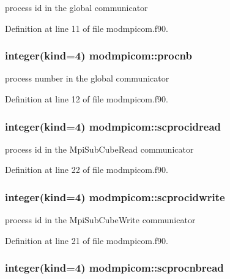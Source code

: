 process id in the global communicator 



Definition at line 11 of file modmpicom.\-f90.

\hypertarget{classmodmpicom_a5e40853b0f15e4c14658ea56fb1b9b73}{
\subsubsection[{procnb}]{\setlength{\rightskip}{0pt plus 5cm}integer(kind=4) modmpicom\-::procnb}}\label{classmodmpicom_a5e40853b0f15e4c14658ea56fb1b9b73}


process number in the global communicator 



Definition at line 12 of file modmpicom.\-f90.

\hypertarget{classmodmpicom_a23d8fed28f6705c564d6a10038de36c7}{
\subsubsection[{scprocidread}]{\setlength{\rightskip}{0pt plus 5cm}integer(kind=4) modmpicom\-::scprocidread}}\label{classmodmpicom_a23d8fed28f6705c564d6a10038de36c7}


process id in the Mpi\-Sub\-Cube\-Read communicator 



Definition at line 22 of file modmpicom.\-f90.

\hypertarget{classmodmpicom_a0bade7a409f7af1432be0253a6262442}{
\subsubsection[{scprocidwrite}]{\setlength{\rightskip}{0pt plus 5cm}integer(kind=4) modmpicom\-::scprocidwrite}}\label{classmodmpicom_a0bade7a409f7af1432be0253a6262442}


process id in the Mpi\-Sub\-Cube\-Write communicator 



Definition at line 21 of file modmpicom.\-f90.

\hypertarget{classmodmpicom_a8fde31beaf4b43228d7f93325630cefa}{
\subsubsection[{scprocnbread}]{\setlength{\rightskip}{0pt plus 5cm}integer(kind=4) modmpicom\-::scprocnbread}}\label{classmodmpicom_a8fde31beaf4b43228d7f93325630cefa}


